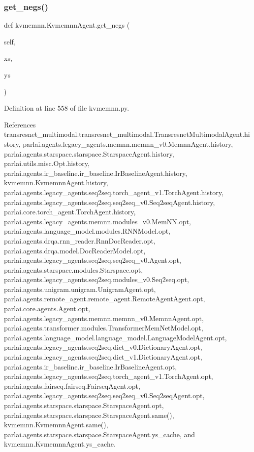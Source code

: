 \subsubsection{\texorpdfstring{get\+\_\+negs()}{get\_negs()}}
{\footnotesize\ttfamily def kvmemnn.\+Kvmemnn\+Agent.\+get\+\_\+negs (\begin{DoxyParamCaption}\item[{}]{self,  }\item[{}]{xs,  }\item[{}]{ys }\end{DoxyParamCaption})}



Definition at line 558 of file kvmemnn.\+py.



References transresnet\+\_\+multimodal.\+transresnet\+\_\+multimodal.\+Transresnet\+Multimodal\+Agent.\+history, parlai.\+agents.\+legacy\+\_\+agents.\+memnn.\+memnn\+\_\+v0.\+Memnn\+Agent.\+history, parlai.\+agents.\+starspace.\+starspace.\+Starspace\+Agent.\+history, parlai.\+utils.\+misc.\+Opt.\+history, parlai.\+agents.\+ir\+\_\+baseline.\+ir\+\_\+baseline.\+Ir\+Baseline\+Agent.\+history, kvmemnn.\+Kvmemnn\+Agent.\+history, parlai.\+agents.\+legacy\+\_\+agents.\+seq2seq.\+torch\+\_\+agent\+\_\+v1.\+Torch\+Agent.\+history, parlai.\+agents.\+legacy\+\_\+agents.\+seq2seq.\+seq2seq\+\_\+v0.\+Seq2seq\+Agent.\+history, parlai.\+core.\+torch\+\_\+agent.\+Torch\+Agent.\+history, parlai.\+agents.\+legacy\+\_\+agents.\+memnn.\+modules\+\_\+v0.\+Mem\+N\+N.\+opt, parlai.\+agents.\+language\+\_\+model.\+modules.\+R\+N\+N\+Model.\+opt, parlai.\+agents.\+drqa.\+rnn\+\_\+reader.\+Rnn\+Doc\+Reader.\+opt, parlai.\+agents.\+drqa.\+model.\+Doc\+Reader\+Model.\+opt, parlai.\+agents.\+legacy\+\_\+agents.\+seq2seq.\+seq2seq\+\_\+v0.\+Agent.\+opt, parlai.\+agents.\+starspace.\+modules.\+Starspace.\+opt, parlai.\+agents.\+legacy\+\_\+agents.\+seq2seq.\+modules\+\_\+v0.\+Seq2seq.\+opt, parlai.\+agents.\+unigram.\+unigram.\+Unigram\+Agent.\+opt, parlai.\+agents.\+remote\+\_\+agent.\+remote\+\_\+agent.\+Remote\+Agent\+Agent.\+opt, parlai.\+core.\+agents.\+Agent.\+opt, parlai.\+agents.\+legacy\+\_\+agents.\+memnn.\+memnn\+\_\+v0.\+Memnn\+Agent.\+opt, parlai.\+agents.\+transformer.\+modules.\+Transformer\+Mem\+Net\+Model.\+opt, parlai.\+agents.\+language\+\_\+model.\+language\+\_\+model.\+Language\+Model\+Agent.\+opt, parlai.\+agents.\+legacy\+\_\+agents.\+seq2seq.\+dict\+\_\+v0.\+Dictionary\+Agent.\+opt, parlai.\+agents.\+legacy\+\_\+agents.\+seq2seq.\+dict\+\_\+v1.\+Dictionary\+Agent.\+opt, parlai.\+agents.\+ir\+\_\+baseline.\+ir\+\_\+baseline.\+Ir\+Baseline\+Agent.\+opt, parlai.\+agents.\+legacy\+\_\+agents.\+seq2seq.\+torch\+\_\+agent\+\_\+v1.\+Torch\+Agent.\+opt, parlai.\+agents.\+fairseq.\+fairseq.\+Fairseq\+Agent.\+opt, parlai.\+agents.\+legacy\+\_\+agents.\+seq2seq.\+seq2seq\+\_\+v0.\+Seq2seq\+Agent.\+opt, parlai.\+agents.\+starspace.\+starspace.\+Starspace\+Agent.\+opt, parlai.\+agents.\+starspace.\+starspace.\+Starspace\+Agent.\+same(), kvmemnn.\+Kvmemnn\+Agent.\+same(), parlai.\+agents.\+starspace.\+starspace.\+Starspace\+Agent.\+ys\+\_\+cache, and kvmemnn.\+Kvmemnn\+Agent.\+ys\+\_\+cache.

